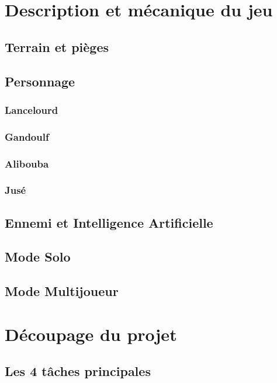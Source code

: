 \documentclass[12pt]{report}
\begin{document}
\chapter{Description et mécanique du jeu}
		
	\section{Terrain et pièges}
			
	\section{Personnage}
	
		\subsection{Lancelourd}
		
		\subsection{Gandoulf}
		
		\subsection{Alibouba}
		
		\subsection{Jusé}

	\section{Ennemi et Intelligence Artificielle}
	
	\section{Mode Solo}
		
	\section{Mode Multijoueur}
					
\chapter{Découpage du projet} %
	\section{Les 4 tâches principales}
\end{document}
